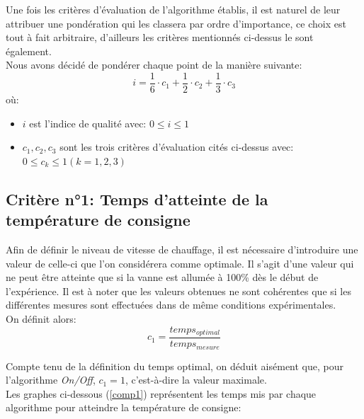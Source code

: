 \documentclass[12pt]{report}
\begin{document}
\noindent
Une fois les critères d'évaluation de l'algorithme établis, il est naturel de leur attribuer une pondération qui les classera par ordre d'importance, ce choix est tout à fait arbitraire, d'ailleurs les critères mentionnés ci-dessus le sont également.\\
Nous avons décidé de pondérer chaque point de la manière suivante:
\begin{equation}
i = \frac{1}{6} \cdot c_1 + \frac{1}{2} \cdot c_2 + \frac{1}{3} \cdot c_3
\label{indice}
\end{equation}
où:
\begin{itemize}
\item $i$ est l'indice de qualité avec: $0 \le i \le 1$ 
\item $c_1, c_2, c_3$ sont les trois critères d'évaluation cités ci-dessus avec: $0 \le c_k \le 1 (k= 1,2,3)$
\end{itemize}

\subsection{Critère n°1: Temps d'atteinte de la température de consigne}
Afin de définir le niveau de vitesse de chauffage, il est nécessaire d'introduire une valeur de celle-ci que l'on considérera comme optimale. Il s'agit d'une valeur qui ne peut être atteinte que si la vanne est allumée à 100\% dès le début de l'expérience. Il est à noter que les valeurs obtenues ne sont cohérentes que si les différentes mesures sont effectuées dans de même conditions expérimentales.\\
On définit alors:
\begin{equation}
c_1 = \frac{temps_{optimal}}{temps_{mesure}}
\end{equation}

\noindent
Compte tenu de la définition du temps optimal, on déduit aisément que, pour l'algorithme \emph{On/Off}, $c_1 = 1$, c'est-à-dire la valeur maximale.\\
\noindent
Les graphes ci-dessous (\ref{comp1}) représentent les temps mis par chaque algorithme pour atteindre la température de consigne:
\end{document}
